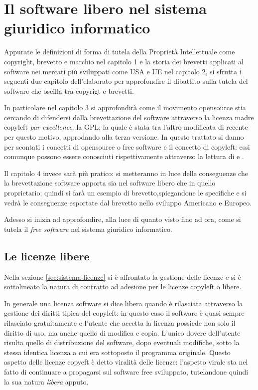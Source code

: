  \chapter{Il software libero nel sistema giuridico informatico}

Appurate le definizioni di forma di tutela della Proprietà Intellettuale come copyright, brevetto e marchio nel capitolo 1 e la storia dei brevetti applicati al software nei mercati più sviluppati come USA e UE nel capitolo 2, si sfrutta i seguenti due capitolo dell'elaborato per approfondire il dibattito sulla tutela del software che oscilla tra copyrigt e brevetti.

In particolare nel capitolo 3 si approfondirà come il movimento opensource stia cercando di difendersi dalla brevettazione del software attraverso la licenza madre copyleft \textit{par excellence}: la GPL; la quale è stata tra l'altro modificata di recente per questo motivo, approdando alla terza versione.
In questo trattato si danno per scontati i concetti di opensource o free software e il concetto di copyleft: essi comunque possono essere conosciuti rispettivamente attraverso la lettura di \cite[Compendio di libertà informatica e cultura open]{Aliprandi-compendio} e \cite[Copyleft e Opencontent]{Aliprandi-copyleft}.

Il capitolo 4 invece sarà più pratico: si metteranno in luce delle conseguenze che la brevettazione software apporta sia nel software libero che in quello proprietario; quindi si farà un esempio di brevetto,spiegandone le specifiche e si vedrà le conseguenze esportate dal brevetto nello sviluppo Americano e Europeo.

Adesso si inizia ad approfondire, alla luce di quanto visto fino ad ora, come si tutela il \textit{free software} nel sistema giuridico informatico.


\section{Le licenze libere}

Nella sezione \ref{sec:sistema-licenze} si è affrontato la gestione delle licenze e si è sottolineato la natura di contratto ad adesione per le licenze copyleft o libere.

In generale una licenza software si dice libera quando è rilasciata attraverso la gestione dei diritti tipica del copyleft: in questo caso il software è quasi sempre rilasciato gratuitamente e l'utente che accetta la licenza possiede non solo il diritto di uso, ma anche quello di modifica e copia. L'unico dovere dell'utente risulta quello di distribuzione del software, dopo eventuali modifiche, sotto la stessa identica licenza a cui era sottoposto il programma originale. Questo aspetto delle licenze copyeft è detto viralità delle licenze: l'aspetto virale sta nel fatto di continuare a propagarsi sul software free sviluppato, tutelandone quindi la sua natura \textit{libera} apputo.

